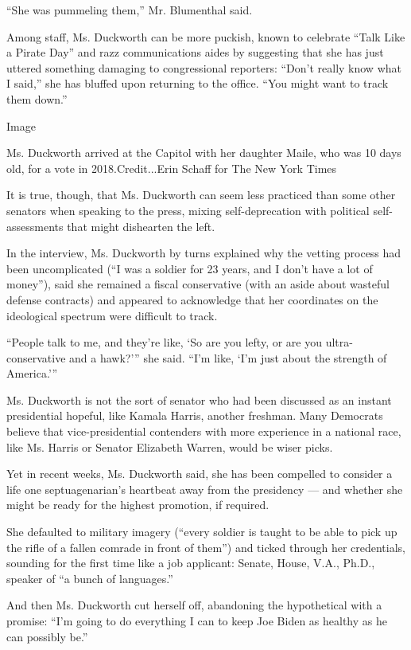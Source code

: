 ``She was pummeling them,'' Mr. Blumenthal said.

Among staff, Ms. Duckworth can be more puckish, known to celebrate
``Talk Like a Pirate Day'' and razz communications aides by suggesting
that she has just uttered something damaging to congressional reporters:
``Don't really know what I said,'' she has bluffed upon returning to the
office. ``You might want to track them down.''

Image

Ms. Duckworth arrived at the Capitol with her daughter Maile, who was 10
days old, for a vote in 2018.Credit...Erin Schaff for The New York Times

It is true, though, that Ms. Duckworth can seem less practiced than some
other senators when speaking to the press, mixing self-deprecation with
political self-assessments that might dishearten the left.

In the interview, Ms. Duckworth by turns explained why the vetting
process had been uncomplicated (``I was a soldier for 23 years, and I
don't have a lot of money''), said she remained a fiscal conservative
(with an aside about wasteful defense contracts) and appeared to
acknowledge that her coordinates on the ideological spectrum were
difficult to track.

``People talk to me, and they're like, `So are you lefty, or are you
ultra-conservative and a hawk?''' she said. ``I'm like, `I'm just about
the strength of America.'''

Ms. Duckworth is not the sort of senator who had been discussed as an
instant presidential hopeful, like Kamala Harris, another freshman. Many
Democrats believe that vice-presidential contenders with more experience
in a national race, like Ms. Harris or Senator Elizabeth Warren, would
be wiser picks.

Yet in recent weeks, Ms. Duckworth said, she has been compelled to
consider a life one septuagenarian's heartbeat away from the presidency
--- and whether she might be ready for the highest promotion, if
required.

She defaulted to military imagery (``every soldier is taught to be able
to pick up the rifle of a fallen comrade in front of them'') and ticked
through her credentials, sounding for the first time like a job
applicant: Senate, House, V.A., Ph.D., speaker of ``a bunch of
languages.''

And then Ms. Duckworth cut herself off, abandoning the hypothetical with
a promise: ``I'm going to do everything I can to keep Joe Biden as
healthy as he can possibly be.''

